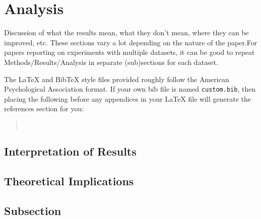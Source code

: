 \section{Analysis}
\textcolor{black!40}{Discussion of what the results mean, what they don't mean, where they can be improved, etc. These sections vary a lot depending on the nature of the paper.For papers reporting on experiments with multiple datasets, it can be good to repeat Methods/Results/Analysis in separate (sub)sections for each dataset.}

The \LaTeX{} and Bib\TeX{} style files provided roughly follow the American Psychological Association format.
If your own bib file is named \texttt{custom.bib}, then placing the following before any appendices in your \LaTeX{} file will generate the references section for you:
\begin{quote}
\begin{verbatim}


\end{verbatim}
\end{quote}
% 
% 

\subsection{Interpretation of Results}
\textcolor{black!30}{\lipsum[53-56]}

\subsection{Theoretical Implications}
\textcolor{black!30}{\lipsum[57-59]}
\nocite{Ando2005,augenstein-etal-2016-stance,andrew2007scalable,rasooli-tetrault-2015,goodman-etal-2016-noise,harper-2014-learning}
\subsection{Subsection}
\textcolor{black!30}{\lipsum[60-62]}